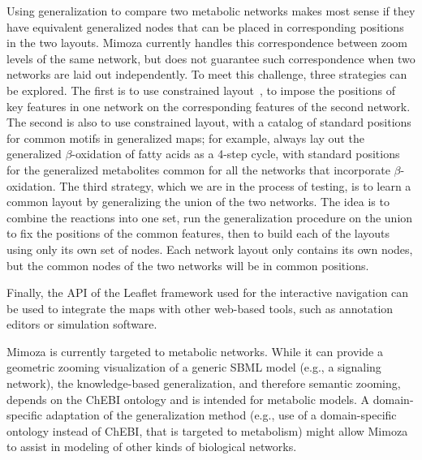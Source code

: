 \documentclass{bmcart}
\begin{document}
Using generalization to compare two metabolic networks makes most sense if they have equivalent generalized nodes that can be placed in corresponding positions in the two layouts. Mimoza currently handles this correspondence between zoom levels of the same network, but does not guarantee such correspondence when two networks are laid out independently.
To meet this challenge, three strategies can be explored.
The first is to use constrained layout~\cite{Karl-FriedrichBohringer}, to impose the positions of key features in one network on the corresponding features of the second network.
The second is also to use constrained layout, with a catalog of standard positions for common motifs in generalized maps; for example, always lay out the generalized $\beta$-oxidation of fatty acids as a 4-step cycle, with standard positions for the generalized metabolites common for all the networks that incorporate $\beta$-oxidation.
The third strategy, which we are in the process of testing, is to learn a common layout by generalizing the union of the two networks. The idea is to combine the reactions into one set, run the generalization procedure on the union to fix the positions of the common features, then to build each of the layouts using only its own set of nodes. Each network layout only contains its own nodes, but the common nodes of the two networks will be in common positions.


Finally, the API of the Leaflet framework used for the interactive navigation can be used to integrate the maps with other web-based tools, such as annotation editors or simulation software.

Mimoza is currently targeted to metabolic networks. While it can provide a geometric zooming visualization of a generic SBML model (e.g., a signaling network), the knowledge-based generalization, and therefore semantic zooming, depends on the ChEBI ontology and is intended for metabolic models. A domain-specific adaptation of the generalization method (e.g., use of a domain-specific ontology instead of ChEBI, that is targeted to metabolism) might allow Mimoza to assist in modeling of other kinds of biological networks. 

\end{document}
